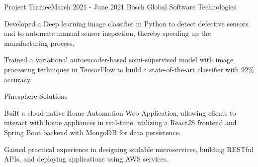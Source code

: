 	\resumeItemListEnd
    \vspace{-1pt}
    
    \resumeSubheading
		{Project Trainee}{March 2021 - June 2021}
		{Bosch Global Software Technologies}{}
		\resumeItemListStart
        \item{Developed a Deep learning image classifier in Python to detect defective sensors and to automate manual sensor inspection, thereby speeding up the manufacturing process.}
        \item{Trained a variational autoencoder-based semi-supervised model with image processing techniques in TensorFlow to build a state-of-the-art classifier with 92\% accuracy.}
	\resumeItemListEnd
\vspace{-1pt}

   {Pinesphere Solutions} {}
    \resumeItemListStart                
          {
    \item Built a cloud-native Home Automation Web Application, allowing clients to interact with home appliances in real-time, utilizing a ReactJS frontend and Spring Boot backend with MongoDB for data persistence.
  \item Gained practical experience in designing scalable microservices, building RESTful APIs, and deploying applications using AWS services.
  }
\resumeItemListEnd

\resumeSubHeadingListEnd
\vspace{5pt}

